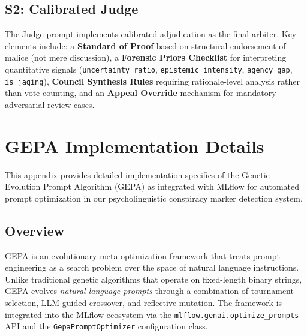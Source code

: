 \documentclass[11pt]{article}
\begin{document}




\subsection{S2: Calibrated Judge}
\label{sec:prompt-judge}

The Judge prompt implements calibrated adjudication as the final arbiter. Key
elements include: a \textbf{Standard of Proof} based on structural endorsement
of malice (not mere discussion), a \textbf{Forensic Priors Checklist} for
interpreting quantitative signals (\texttt{uncertainty\_ratio},
\texttt{epistemic\_intensity}, \texttt{agency\_gap}, \texttt{is\_jaqing}),
\textbf{Council Synthesis Rules} requiring rationale-level analysis rather than
vote counting, and an \textbf{Appeal Override} mechanism for mandatory
adversarial review cases.





\section{GEPA Implementation Details}
\label{sec:gepa-details}

This appendix provides detailed implementation specifics of the Genetic
Evolution Prompt Algorithm (GEPA) \cite{agrawal2025gepa} as integrated with
MLflow \cite{mlflow2024} for automated prompt optimization in our
psycholinguistic conspiracy marker detection system.

\subsection{Overview}

GEPA is an evolutionary meta-optimization framework that treats prompt
engineering as a search problem over the space of natural language
instructions. Unlike traditional genetic algorithms that operate on
fixed-length binary strings, GEPA evolves \textit{natural language prompts}
through a combination of tournament selection, LLM-guided crossover, and
reflective mutation. The framework is integrated into the MLflow ecosystem via
the \texttt{mlflow.genai.optimize\_prompts} API and the
\texttt{GepaPromptOptimizer} configuration class.
\end{document}
